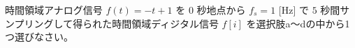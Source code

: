 時間領域アナログ信号 $f(t) = -t+1$ を $0$ 秒地点から $f_s = 1$ [Hz] で $5$ 秒間サンプリングして得られた時間領域ディジタル信号 $f[i]$ を選択肢a〜dの中から1つ選びなさい。
